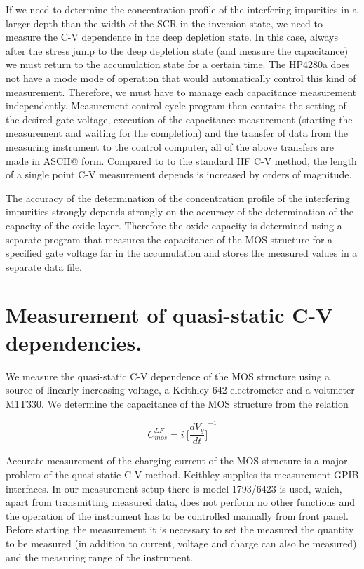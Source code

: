 If we need to determine the concentration profile of the interfering
impurities in a larger depth than the width of the SCR in the
inversion state, we need to measure the C-V dependence in the deep
depletion state. In this case, always after the stress jump to the
deep depletion state (and measure the capacitance) we must return to
the accumulation state for a certain time. The HP4280a does not have a
mode mode of operation that would automatically control this kind of
measurement. Therefore, we must have to manage each capacitance
measurement independently. Measurement control cycle program then
contains the setting of the desired gate voltage, execution of the
capacitance measurement (starting the measurement and waiting for the
completion) and the transfer of data from the measuring instrument to
the control computer, all of the above transfers are made in ASCII@
form. Compared to to the standard HF C-V method, the length of a
single point C-V measurement depends is increased by orders of
magnitude.

The accuracy of the determination of the concentration profile of the
interfering impurities strongly depends strongly on the accuracy of
the determination of the capacity of the oxide layer.  Therefore the
oxide capacity is determined using a separate program that measures
the capacitance of the MOS structure for a specified gate voltage far
in the accumulation and stores the measured values in a separate data
file.

\section{Measurement of quasi-static C-V dependencies.}\label{sec:5.2}

We measure the quasi-static C-V dependence of the MOS structure using
a source of linearly increasing voltage, a Keithley 642 electrometer
and a voltmeter M1T330. We determine the capacitance of the MOS
structure from the relation

\begin{equation}\label{eq:5.1}
  C_{mos}^{LF} = i\ {\bigg[\frac{dV_{g}}{dt}\bigg]}^{-1}
\end{equation}

Accurate measurement of the charging current of the MOS structure is a
major problem of the quasi-static C-V method. Keithley supplies its
measurement GPIB interfaces. In our measurement setup there is model
1793/6423 is used, which, apart from transmitting measured data, does
not perform no other functions and the operation of the instrument has
to be controlled manually from front panel.  Before starting the
measurement it is necessary to set the measured the quantity to be
measured (in addition to current, voltage and charge can also be
measured) and the measuring range of the instrument.

